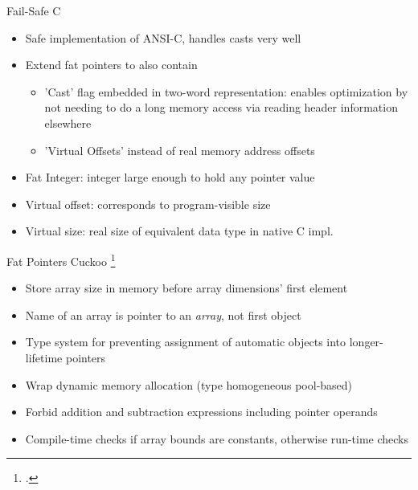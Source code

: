\documentclass[aspectratio=169]{beamer}
\begin{document}
\begin{frame}{Fail-Safe C}
\begin{itemize}
\item Safe implementation of ANSI-C, handles casts very well
\item Extend fat pointers to also contain
    \begin{itemize}
        \item 'Cast' flag embedded in two-word representation: enables optimization by not needing to do a long memory access via reading header information elsewhere
        \item 'Virtual Offsets' instead of real memory address offsets
    \end{itemize}
\item Fat Integer: integer large enough to hold any pointer value
\item Virtual offset: corresponds to program-visible size
\item Virtual size: real size of equivalent data type in native C impl.
\end{itemize}
\end{frame}

\begin{frame}{Fat Pointers}
Cuckoo \footcite{west_cuckoo:_2005}
      \begin{itemize}
       \item Store array size in memory before array dimensions' first element
       \item Name of an array is pointer to an \emph{array}, not first object
       \item Type system for preventing assignment of automatic objects into longer-lifetime pointers
       \item Wrap dynamic memory allocation (type homogeneous pool-based) %
       \item Forbid addition and subtraction expressions including pointer operands
       \item Compile-time checks if array bounds are constants, otherwise run-time checks
      \end{itemize}
\end{frame}
\end{document}
